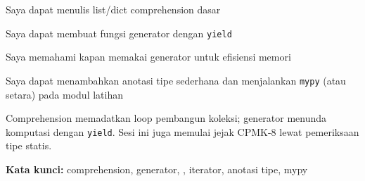 \documentclass[../main.tex]{subfiles}
\begin{document}
\begin{checklist}
  \item Saya dapat menulis list/dict comprehension dasar
  \item Saya dapat membuat fungsi generator dengan \texttt{yield}
  \item Saya memahami kapan memakai generator untuk efisiensi memori
  \item Saya dapat menambahkan anotasi tipe sederhana dan menjalankan \texttt{mypy} (atau setara) pada modul latihan
\end{checklist}

\begin{rangkuman}
Comprehension memadatkan loop pembangun koleksi; generator menunda komputasi dengan \texttt{yield}. Sesi ini juga memulai jejak CPMK-8 lewat pemeriksaan tipe statis.

\textbf{Kata kunci:} comprehension, generator, , iterator, anotasi tipe, mypy
\end{rangkuman}
\end{document}
